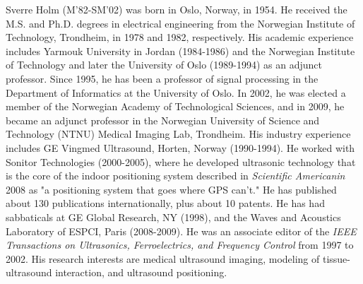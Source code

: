 \documentclass[journal]{IEEEtran}
\begin{document}
\begin{IEEEbiography}{Sverre Holm}
(M’82-SM’02) was born in Oslo, Norway, in 1954. He received the M.S. and Ph.D. degrees in electrical engineering from the Norwegian Institute of Technology, Trondheim, in 1978 and 1982, respectively. His academic experience includes Yarmouk University in Jordan (1984-1986) and the Norwegian Institute of Technology and later the University of Oslo (1989-1994) as an adjunct professor. Since 1995, he has been a professor of signal processing in the Department of Informatics at the University of Oslo. In 2002, he was elected a member of the Norwegian Academy of Technological Sciences, and in 2009, he became an adjunct professor in the Norwegian University of Science and Technology (NTNU) Medical Imaging Lab, Trondheim. His industry experience includes GE Vingmed Ultrasound, Horten, Norway (1990-1994). He worked with Sonitor Technologies (2000-2005), where he developed ultrasonic technology that is the core of the indoor positioning system described in \textit{Scientific Americanin} 2008 as "a positioning system that goes where GPS can't." He has published about 130 publications internationally, plus about 10 patents. He has had sabbaticals at GE Global Research, NY (1998), and the Waves and 
Acoustics Laboratory of ESPCI, Paris (2008-2009). He was an associate editor of the \textit{IEEE Transactions on Ultrasonics, Ferroelectrics, and Frequency Control} from 1997 to 2002. His research interests are medical ultrasound imaging, modeling of tissue-ultrasound interaction, and ultrasound positioning.
\end{IEEEbiography}

\vfill





\end{document}
